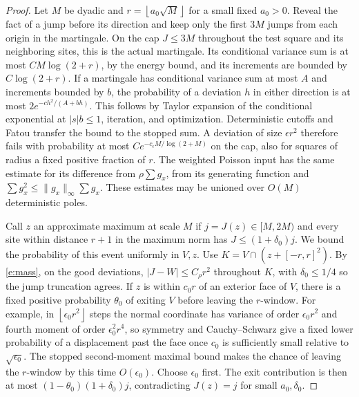\documentclass[11pt]{amsart}
\newcommand{\1}{\mathbf 1}
\newcommand{\floor}[1]{\left\lfloor #1\right\rfloor}
\begin{document}
\begin{proof}
Let \(M\) be dyadic and \(r=\floor{a_0\sqrt M}\) for a small fixed \(a_0>0\). Reveal the fact of a jump before its direction and keep only the first \(3M\) jumps from each origin in the martingale. On the cap \(J\le3M\) throughout the test square and its neighboring sites, this is the actual martingale. Its conditional variance sum is at most \(CM\log(2+r)\), by the energy bound, and its increments are bounded by \(C\log(2+r)\). If a martingale has conditional variance sum at most \(A\) and increments bounded by \(b\), the probability of a deviation \(h\) in either direction is at most \(2e^{-c h^2/(A+bh)}\). This follows by Taylor expansion of the conditional exponential at \(|s|b\le1\), iteration, and optimization. Deterministic cutoffs and Fatou transfer the bound to the stopped sum. A deviation of size \(\epsilon r^2\) therefore fails with probability at most \(C e^{-c_\epsilon M/\log(2+M)}\) on the cap, also for squares of radius a fixed positive fraction of \(r\). The weighted Poisson input has the same estimate for its difference from \(\rho\sum g_x\), from its generating function and \(\sum g_x^2\le\|g_x\|_\infty\sum g_x\). These estimates may be unioned over \(O(M)\) deterministic poles.

Call \(z\) an approximate maximum at scale \(M\) if \(j=J(z)\in[M,2M)\) and every site within distance \(r+1\) in the maximum norm has \(J\le(1+\delta_0)j\). We bound the probability of this event uniformly in \(V,z\). Use \(K=V\cap(z+[-r,r]^2)\). By \eqref{e:mass}, on the good deviations, \(|J-W|\le C_\rho r^2\) throughout \(K\), with \(\delta_0\le1/4\) so the jump truncation agrees. If \(z\) is within \(c_0r\) of an exterior face of \(V\), there is a fixed positive probability \(\theta_0\) of exiting \(V\) before leaving the \(r\)-window. For example, in \(\floor{\epsilon_0r^2}\) steps the normal coordinate has variance of order \(\epsilon_0r^2\) and fourth moment of order \(\epsilon_0^2 r^4\), so symmetry and Cauchy--Schwarz give a fixed lower probability of a displacement past the face once \(c_0\) is sufficiently small relative to \(\sqrt{\epsilon_0}\). The stopped second-moment maximal bound makes the chance of leaving the \(r\)-window by this time \(O(\epsilon_0)\). Choose \(\epsilon_0\) first. The exit contribution is then at most \((1-\theta_0)(1+\delta_0)j\), contradicting \(J(z)=j\) for small \(a_0,\delta_0\).


\end{proof}
\end{document}
